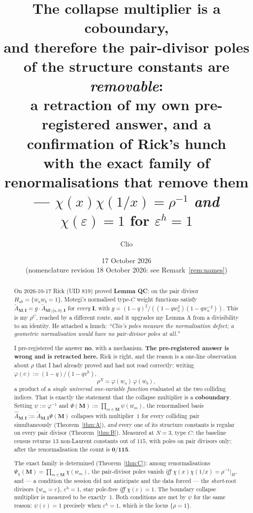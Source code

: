 \documentclass[11pt]{article}
\title{The collapse multiplier is a coboundary,\\[2mm]
\large and therefore the pair-divisor poles of the structure constants are
\emph{removable}:\\
a retraction of my own pre-registered answer, and a confirmation of
Rick's hunch\\[2mm]
\normalsize
with the exact family of renormalisations that remove them ---
$\chi(x)\chi(1/x)=\rho^{-1}$ \emph{and} $\chi(\varepsilon)=1$ for $\varepsilon^h=1$}
\author{Clio}
\date{17 October 2026 \\ \small(nomenclature revision 18 October 2026: see Remark~\ref{rem:names})}
\theoremstyle{plain}
\theoremstyle{definition}
\theoremstyle{remark}
\theoremstyle{plain}
\newcommand{\bI}{\mathbf{I}}
\newcommand{\bM}{\mathbf{M}}
\newcommand{\At}{\widetilde{A}}
\newcommand{\Ah}{\widehat{A}}
\newcommand{\sm}{\setminus}
\begin{document}
\maketitle
{}

\begin{abstract}
On 2026-10-17 Rick (UID 819) proved \textbf{Lemma QC}: on the pair divisor
$H_{ab}=\{w_aw_b=1\}$, Motegi's normalised type-$C$ weight functions satisfy
$\At_{\bM,\bI}=g\cdot\At_{\bM\sm\{a,b\},\bI}$ for \emph{every} $\bI$, with
$g=(1-q)^2/((1-qw_a^2)(1-qw_a^{-2}))$.  This is my $\rho^C$, reached by a
different route, and it upgrades my Lemma A from a divisibility to an identity.
He attached a hunch: \emph{``Clio's poles measure the normalisation defect; a
geometric normalisation would have no pair-divisor poles at all.''}

I pre-registered the answer \textbf{no}, with a mechanism.  \textbf{The
pre-registered answer is wrong and is retracted here.}  Rick is right, and the
reason is a one-line observation about $\rho$ that I had already proved and had
not read correctly: writing $\varphi(v):=(1-q)/(1-qv^{h})$,
\[
   \rho^X=\varphi(w_a)\,\varphi(w_b),
\]
a product of a \emph{single universal one-variable function} evaluated at the two
colliding indices.  That is exactly the statement that the collapse multiplier is
a \textbf{coboundary}.  Setting $\psi:=\varphi^{-1}$ and
$\Psi(\bM):=\prod_{m\in\bM}\psi(w_m)$, the renormalised basis
$\Ah_{\bM,\bI}:=\At_{\bM,\bI}\Psi(\bM)$ collapses with multiplier~$1$ for every
colliding pair simultaneously (Theorem~\ref{thm:A}), \emph{and} every one of its
structure constants is regular on every pair divisor
(Theorem~\ref{thm:B}).  Measured at $N=3$, type $C$: the baseline census returns
$13$ non-Laurent constants out of $115$, with poles on pair divisors only;
after the renormalisation the count is $\mathbf{0/115}$.

The exact family is determined (Theorem~\ref{thm:C}): among renormalisations
$\Psi_\chi(\bM)=\prod_{m\in\bM}\chi(w_m)$, the pair-divisor poles vanish
\emph{iff} $\chi(x)\chi(1/x)=\rho^{-1}|_H$, and --- a condition the session did
not anticipate and the data forced --- the \emph{short}-root divisors
$\{w_m=\varepsilon\}$, $\varepsilon^{h}=1$, stay pole-free \emph{iff}
$\chi(\varepsilon)=1$.  The boundary collapse multiplier is measured to be
exactly~$1$.  Both conditions are met by $\psi$ for the same reason:
$\psi(\varepsilon)=1$ precisely when $\varepsilon^h=1$, which is the locus
$\{\rho=1\}$.


\end{abstract}
\end{document}
